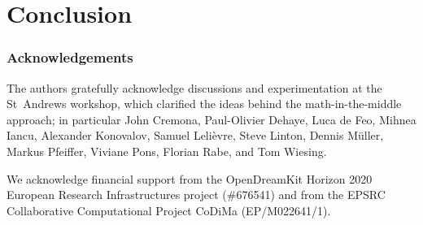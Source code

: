 \section{Conclusion}
\subsubsection*{Acknowledgements}
The authors gratefully acknowledge discussions and experimentation at the St~Andrews
workshop, which clarified the ideas behind the math-in-the-middle approach;
in particular John Cremona, Paul-Olivier Dehaye, Luca de Feo, Mihnea Iancu, Alexander
Konovalov, Samuel Leli\`evre, Steve Linton, Dennis M\"uller, Markus Pfeiffer, Viviane Pons,
Florian Rabe, and Tom Wiesing.

We acknowledge financial support from the OpenDreamKit Horizon 2020 European Research
Infrastructures project (\#676541) and from the EPSRC Collaborative Computational Project
CoDiMa (EP/M022641/1).



